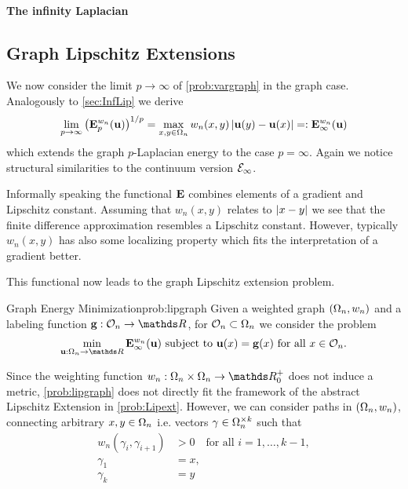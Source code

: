 \paragraph{The infinity Laplacian}

%
%

\subsection{Graph Lipschitz Extensions}\label{sec:GLipExt}
%
We now consider the limit $p\to\infty$ of \cref{prob:vargraph} in the graph case. Analogously to \cref{sec:InfLip} we derive
%
\begin{align*}
\lim_{p\to\infty} \left(\mathbf{E}^{w_n}_p(\mathbf{u})\right)^{1/p}= \max_{x,y\in\Omega_n} w_n(x,y) \left|\mathbf{u}(y) - \mathbf{u}(x)\right|=:\mathbf{E}^{w_n}_\infty(\mathbf{u})
\end{align*}
%
which extends the graph $p$-Laplacian energy to the case $p=\infty$. Again we notice structural similarities to 
the continuum version $\mathcal{E}_\infty$. 
%
\begin{remark}{}{}
Informally speaking the functional $\mathbf{E}$ combines elements of a gradient and Lipschitz constant. Assuming that $w_n(x,y)$ relates to $\left|x-y\right|$ we see that the finite difference approximation
resembles a Lipschitz constant. However, typically $w_n(x,y)$ has also some localizing property which fits the interpretation of a gradient better.
\end{remark}
%
This functional now leads to the graph Lipschitz extension problem.
%
\begin{problem}{Graph Energy Minimization}{prob:lipgraph}
Given a weighted graph $(\Omega_n, w_n)$ and a labeling function $\vec g:\conset_n\to\R$, for $\mathcal{O}_n\subset\Omega_n$ we consider 
the problem
%
\begin{align*}
\min_{\vec u:\domain_n\to\R} \GE_\infty^{w_n}(\vec u) \text{ subject to } \vec u(x) = \vec g(x) \text{ for all } x\in\conset_n.
\end{align*}
\end{problem}
%
\noindent%
Since the weighting function $w_n:\domain_n\times\domain_n\to\R^+_0$ does not induce a metric, \cref{prob:lipgraph} does not directly fit the framework of the abstract Lipschitz Extension in \cref{prob:Lipext}. However, we can consider paths in $(\Omega_n, w_n)$, connecting arbitrary $x,y\in\Omega_n$ i.e. vectors $\gamma\in\Omega_n^{\times k}$ such that 
%
\begin{align*}
w_n(\gamma_i, \gamma_{i+1}) &> 0\quad\text{for all } i=1,\ldots, k-1,\\
\gamma_1 &= x, \\ \gamma_k &= y
\end{align*}
